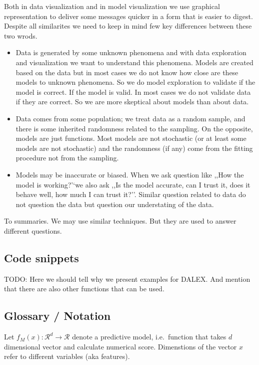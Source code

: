 \documentclass[]{krantz}
\providecommand{\tightlist}{%
  \setlength{\itemsep}{0pt}\setlength{\parskip}{0pt}}
\theoremstyle{definition}
\theoremstyle{definition}
\theoremstyle{definition}
\theoremstyle{remark}
\begin{document}
Both in data visualization and in model visualization we use graphical
representation to deliver some messages quicker in a form that is easier
to digest. Despite all similarites we need to keep in mind few key
differences between these two wrods.

\begin{itemize}
\tightlist
\item
  Data is generated by some unknown phenomena and with data exploration
  and visualization we want to understand this phenomena. Models are
  created based on the data but in most cases we do not know how close
  are these models to unknown phenomena. So we do model exploration to
  validate if the model is correct. If the model is valid. In most cases
  we do not validate data if they are correct. So we are more skeptical
  about models than about data.
\item
  Data comes from some population; we treat data as a random sample, and
  there is some inherited randomness related to the sampling. On the
  opposite, models are just functions. Most models are not stochastic
  (or at least some models are not stochastic) and the randomness (if
  any) come from the fitting procedure not from the sampling.
\item
  Models may be inaccurate or biased. When we ask question like ,,How
  the model is working?'`we also ask ,,Is the model accurate, can I
  trust it, does it behave well, how much I can trust it?''. Similar
  question related to data do not question the data but question our
  understating of the data.
\end{itemize}

To summaries. We may use similar techniques. But they are used to answer
different questions.

\hypertarget{code-snippets}{%
\subsection{Code snippets}\label{code-snippets}}

TODO: Here we should tell why we present examples for DALEX. And mention
that there are also other functions that can be used.

\hypertarget{glossary-notation}{%
\subsection{Glossary / Notation}\label{glossary-notation}}

Let \(f_{M}(x): \mathcal R^{d} \rightarrow \mathcal R\) denote a
predictive model, i.e.~function that takes \(d\) dimensional vector and
calculate numerical score. Dimenstions of the vector \(x\) refer to
different variables (aka features).
\end{document}
